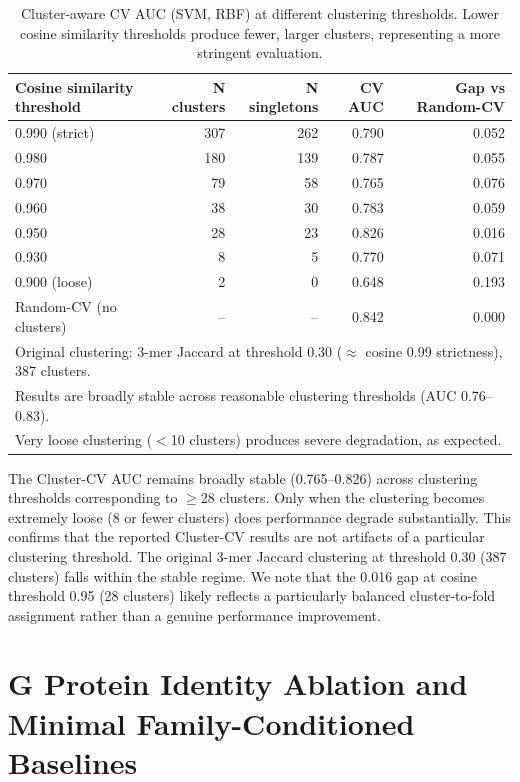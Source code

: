 \documentclass[11pt,a4paper]{article}
\begin{document}
\begin{table}[h!]
\centering
\caption{Cluster-aware CV AUC (SVM, RBF) at different clustering thresholds. Lower cosine similarity thresholds produce fewer, larger clusters, representing a more stringent evaluation.}
\label{tab:cluster_sensitivity}
\begin{tabular}{lrrrr}
\toprule
Cosine similarity threshold & N clusters & N singletons & CV AUC & Gap vs Random-CV \\
\midrule
0.990 (strict)  & 307 & 262 & 0.790 & 0.052 \\
0.980           & 180 & 139 & 0.787 & 0.055 \\
0.970           &  79 &  58 & 0.765 & 0.076 \\
0.960           &  38 &  30 & 0.783 & 0.059 \\
0.950           &  28 &  23 & 0.826 & 0.016 \\
0.930           &   8 &   5 & 0.770 & 0.071 \\
0.900 (loose)   &   2 &   0 & 0.648 & 0.193 \\
\midrule
Random-CV (no clusters) & -- & -- & 0.842 & 0.000 \\
\bottomrule
\multicolumn{5}{l}{\small Original clustering: 3-mer Jaccard at threshold 0.30 ($\approx$ cosine 0.99 strictness), 387 clusters.} \\
\multicolumn{5}{l}{\small Results are broadly stable across reasonable clustering thresholds (AUC 0.76--0.83).} \\
\multicolumn{5}{l}{\small Very loose clustering ($<$10 clusters) produces severe degradation, as expected.} \\
\end{tabular}
\end{table}

The Cluster-CV AUC remains broadly stable (0.765--0.826) across clustering thresholds corresponding to $\ge$28 clusters. Only when the clustering becomes extremely loose (8 or fewer clusters) does performance degrade substantially. This confirms that the reported Cluster-CV results are not artifacts of a particular clustering threshold. The original 3-mer Jaccard clustering at threshold 0.30 (387 clusters) falls within the stable regime. We note that the 0.016 gap at cosine threshold 0.95 (28 clusters) likely reflects a particularly balanced cluster-to-fold assignment rather than a genuine performance improvement.

\section{G Protein Identity Ablation and Minimal Family-Conditioned Baselines}
\end{document}
